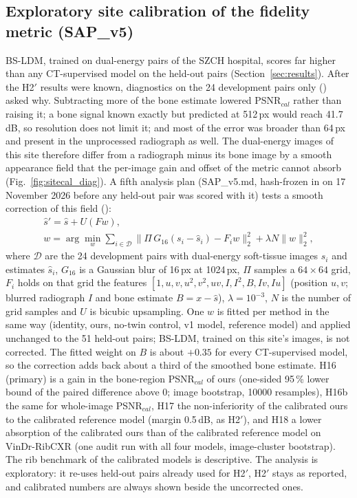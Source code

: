 \subsection{Exploratory site calibration of the fidelity metric (SAP\_v5)}
\label{sec:sitecal}
BS-LDM, trained on dual-energy pairs of the SZCH hospital, scores far higher than any CT-supervised model on the held-out pairs
(Section~\ref{sec:results}). After the H2$'$ results were known, diagnostics on the 24 development pairs only ()
asked why. Subtracting more of the bone estimate lowered PSNR$_{cal}$ rather than raising it; a bone signal known exactly but predicted at
512\,px would reach 41.7\,dB, so resolution does not limit it; and most of the error was broader than 64\,px and present in the unprocessed
radiograph as well. The dual-energy images of this site therefore differ from a radiograph minus its bone image by a smooth appearance field
that the per-image gain and offset of the metric cannot absorb (Fig.~\ref{fig:sitecal_diag}). A fifth analysis plan (SAP\_v5.md, hash-frozen in  on
17 November 2026 before any held-out pair was scored with it) tests a smooth correction of this field ():
\begin{equation}
\begin{gathered}
\hat s'=\hat s+U(F w),\\
w=\arg\min_{w}\sum_{i\in\mathcal{D}}\big\lVert \Pi\,G_{16}(s_i-\hat s_i)-F_i w\big\rVert_2^2+\lambda N\lVert w\rVert_2^2,
\end{gathered}
\label{eq:sitecal}
\end{equation}
where $\mathcal{D}$ are the 24 development pairs with dual-energy soft-tissue images $s_i$ and estimates $\hat s_i$, $G_{16}$ is a Gaussian
blur of 16\,px at 1024\,px, $\Pi$ samples a $64\times64$ grid, $F_i$ holds on that grid the features $[1,u,v,u^2,v^2,uv,I,I^2,B,Iv,Iu]$
(position $u,v$; blurred radiograph $I$ and bone estimate $B=x-\hat s$), $\lambda=10^{-3}$, $N$ is the number of grid samples and $U$ is bicubic
upsampling. One $w$ is fitted per method in the same way (identity, ours, no-twin control, v1 model, reference model) and applied unchanged
to the 51 held-out pairs; BS-LDM, trained on this site's images, is not corrected. The fitted weight on $B$ is about $+0.35$ for every
CT-supervised model, so the correction adds back about a third of the smoothed bone estimate. H16 (primary) is a gain in the bone-region
PSNR$_{cal}$ of ours (one-sided 95\,\% lower bound of the paired difference above 0; image bootstrap, \num{10000} resamples), H16b the same
for whole-image PSNR$_{cal}$, H17 the non-inferiority of the calibrated ours to the calibrated reference model (margin 0.5\,dB, as H2$'$), and
H18 a lower absorption of the calibrated ours than of the calibrated reference model on VinDr-RibCXR (one audit run with all four models,
image-cluster bootstrap). The rib benchmark of the calibrated models is descriptive. The analysis is exploratory: it re-uses held-out pairs
already used for H2$'$, H2$'$ stays as reported, and calibrated numbers are always shown beside the uncorrected ones.

